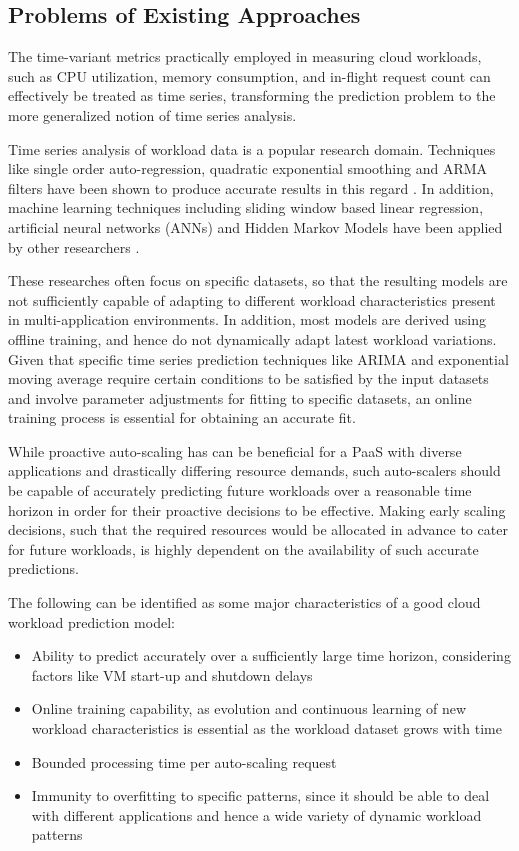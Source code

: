 \subsection{Problems of Existing Approaches}

The time-variant metrics practically employed in measuring cloud workloads, such as CPU utilization, memory consumption, and in-flight request count can effectively be treated as time series, transforming the prediction problem to the more generalized notion of time series analysis.

Time series analysis of workload data is a popular research domain. Techniques like single order auto-regression, quadratic exponential smoothing and ARMA filters have been shown to produce accurate results in this regard \cite{Kupferman_2009} \cite{Mi_2010} \cite{Roy_2011}. In addition, machine learning techniques including sliding window based linear regression, artificial neural networks (ANNs) and Hidden Markov Models have been applied by other researchers \cite{Yang_2013} \cite{Khan_2012}.

These researches often focus on specific datasets, so that the resulting models are not sufficiently capable of adapting to different workload characteristics present in multi-application environments. In addition, most models are derived using offline training, and hence do not dynamically adapt latest workload variations. Given that specific time series prediction techniques like ARIMA and exponential moving average require certain conditions to be satisfied by the input datasets and involve parameter adjustments for fitting to specific datasets, an online training process is essential for obtaining an accurate fit.


While proactive auto-scaling has can be beneficial for a PaaS with diverse applications and drastically differing resource demands, such auto-scalers should be capable of accurately predicting future workloads over a reasonable time horizon in order for their proactive decisions to be effective.
Making early scaling decisions, such that the required resources would be allocated in advance to cater for future workloads, is highly dependent on the availability of such accurate predictions.

The following can be identified as some major characteristics of a good cloud workload prediction model:

\begin{itemize}
\item Ability to predict accurately over a sufficiently large time horizon, considering factors like VM start-up and shutdown delays
\item Online training capability, as evolution and continuous learning of new workload characteristics is essential as the workload dataset grows with time
\item Bounded processing time per auto-scaling request
\item Immunity to overfitting to specific patterns, since it should be able to deal with different applications and hence a wide variety of dynamic workload patterns
\end{itemize}
